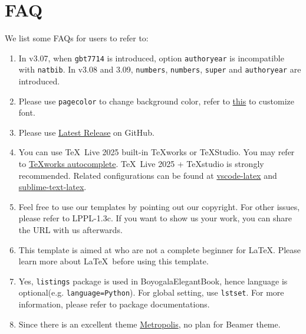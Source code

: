 \documentclass[11pt]{boyogalaelegantbook}
\begin{document}
\chapter{FAQ}
We list some FAQs for users to refer to:
\begin{enumerate}
  \item {}
  In v3.07, when \lstinline{gbt7714} is introduced, option \lstinline{authoryear} is incompatible with \lstinline{natbib}. In v3.08 and 3.09, \lstinline{numbers}, \lstinline{numbers}, \lstinline{super} and \lstinline{authoryear} are introduced.
  \item {}
  Please use \lstinline{pagecolor} to change background color, refer to \href{https://tex.stackexchange.com/questions/278544/xcolor-what-is-the-equivalent-of-default-text-color}{this} to customize font.
  \item {}
  Please use \href{https://github.com/boyogala/BoyogalaElegantBook/releases}{Latest Release} on GitHub.
  \item {}
  You can use \TeX~Live 2025 built-in \TeX works or \TeX Studio. You may refer to \href{https://github.com/EthanDeng/texworks-autocomplete}{\TeX works autocomplete}. \TeX~Live 2025 + \TeX studio is strongly recommended. Related configurations can be found at \href{https://github.com/EthanDeng/vscode-latex}{vscode-latex} and \href{https://github.com/EthanDeng/sublime-text-latex}{sublime-text-latex}.
  \item {}
  Feel free to use our templates by pointing out our copyright. For other issues, please refer to LPPL-1.3c. If you want to show us your work, you can share the URL with us afterwards.
  \item {}
  This template is aimed at who are not a complete beginner for \LaTeX. Please learn more about \LaTeX\ before using this template.
  \item {}
  Yes, \lstinline{listings} package is used in BoyogalaElegantBook, hence language is optional(e.g. \lstinline{language=Python}). For global setting, use \lstinline{lstset}. For more information, please refer to package documentations.
  \item {}
  Since there is an excellent theme \href{https://github.com/matze/mtheme}{Metropolis}, no plan for Beamer theme.
\end{enumerate}
\end{document}
